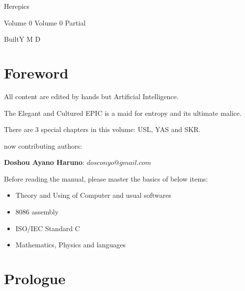 \begin{sloppypar}
\author{dosconio}
\begin{center}
	\sc\fontsize{48pt}{0}\selectfont\textcolor[rgb]{1, 0, 0.618}{Herepics}
\end{center}
\ifdetail{}
{\hfill\sc\fontsize{24pt}{0}\selectfont\textcolor[rgb]{1, 0, 0.618}{Volume 0}}
\else
{\hfill\sc\fontsize{24pt}{0}\selectfont\textcolor[rgb]{1, 0, 0.618}{Volume 0} Partial}
\fi

{\hfill\sc\fontsize{24pt}{0}\selectfont\textcolor[rgb]{1, 0, 0.618}{BuiltY\number\year{} M\number\month{} D\number\day{}}}

\newpage %
\renewcommand{\contentsname}{Contents}
\tableofcontents

\section{Foreword} %

All content\cite{HEREPIC} are edited by hands but Artificial Intelligence.

The Elegant and Cultured EPIC is a maid for entropy and its ultimate malice.

There are 3 special chapters in this volume: USL, YAS and SKR.

now contributing authors:

\textbf{Doshou Ayano Haruno}: 
$dosconyo@gmail.com$

Before reading the manual, please master the basics of below items:
\begin{itemize}
	\item Theory and Using of Computer and usual softwares 
	\item 8086 assembly
	\item ISO/IEC Standard C
	\item Mathematics, Physics and languages
\end{itemize}

\section{Prologue} %



\end{sloppypar}
